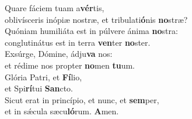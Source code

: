 \evenverse Quare fáciem tuam a\textbf{vér}tis,~\*\\
\evenverse oblivísceris inópiæ nostræ, et tribulati\textbf{ó}nis \textbf{no}stræ?\\
\oddverse Quóniam humiliáta est in púlvere ánima \textbf{no}stra:~\*\\
\oddverse conglutinátus est in terra \textbf{ven}ter \textbf{no}ster.\\
\evenverse Exsúrge, Dómine, ádju\textbf{va} nos:~\*\\
\evenverse et rédime nos propter \textbf{no}men \textbf{tu}um.\\
\oddverse Glória Patri, et \textbf{Fí}lio,~\*\\
\oddverse et Spi\textbf{rí}tui \textbf{San}cto.\\
\evenverse Sicut erat in princípio, et nunc, et \textbf{sem}per,~\*\\
\evenverse et in sǽcula sæcu\textbf{ló}rum. \textbf{A}men.\\

